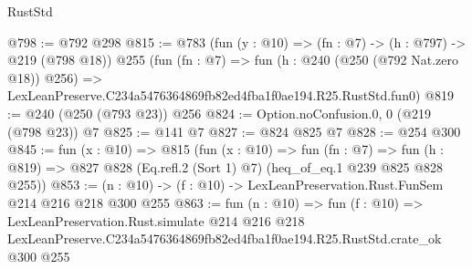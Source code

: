 \begin{lexlean}{RustStd}
\begin{coremodule}
@798 := @792 @298
@815 := @783
    (fun (y : @10) => (fn : @7) -> (h : @797) -> @219 (@798 @18))
    @255
    (fun (fn : @7) =>
    fun (h : @240 (@250 (@792 Nat.zero @18)) @256) =>
    LexLeanPreserve.C234a5476364869fb82ed4fba1f0ae194.R25.RustStd.fun0)
@819 := @240 (@250 (@793 @23)) @256
@824 := Option.noConfusion.{0, 0} (@219 (@798 @23)) @7
@825 := @141 @7
@827 := @824 @825 @7
@828 := @254 @300
@845 := fun (x : @10) =>
  @815
    (fun (x : @10) =>
    fun (fn : @7) =>
    fun (h : @819) => @827 @828 (Eq.refl.{2} (Sort 1) @7) (heq_of_eq.{1} @239 @825 @828 @255))
@853 := (n : @10) -> (f : @10) -> LexLeanPreservation.Rust.FunSem @214 @216 @218 @300 @255
@863 := fun (n : @10) =>
  fun (f : @10) =>
  LexLeanPreservation.Rust.simulate
    @214
    @216
    @218
    LexLeanPreserve.C234a5476364869fb82ed4fba1f0ae194.R25.RustStd.crate_ok
    @300
    @255
\end{coremodule}
\end{lexlean}
